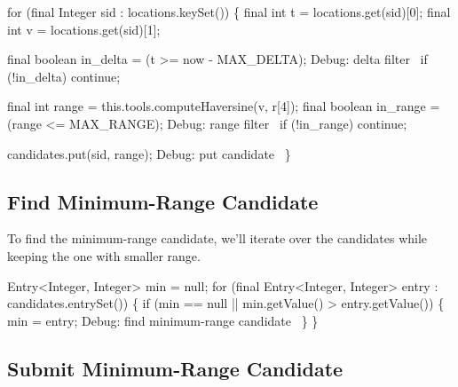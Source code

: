 \nwenddocs{}\endmoddef\nwstartdeflinemarkup{}\nwenddeflinemarkup
for (final Integer sid : locations.keySet()) \{
  final int t = locations.get(sid)[0];
  final int v = locations.get(sid)[1];

  final boolean in_delta = (t >= now - MAX_DELTA);
  \LA{}Debug: delta filter~{\nwtagstyle{}}\RA{}
  if (!in_delta)
    continue;

  final int range = this.tools.computeHaversine(v, r[4]);
  final boolean in_range = (range <= MAX_RANGE);
  \LA{}Debug: range filter~{\nwtagstyle{}}\RA{}
  if (!in_range)
    continue;

  candidates.put(sid, range);
  \LA{}Debug: put candidate~{\nwtagstyle{}}\RA{}
\}
\nwendcode{}\nwdocspar

\subsection{Find Minimum-Range Candidate}

To find the minimum-range candidate, we'll iterate over the candidates while
keeping the one with smaller range.

\nwenddocs{}\endmoddef\nwstartdeflinemarkup{}\nwenddeflinemarkup
Entry<Integer, Integer> min = null;
for (final Entry<Integer, Integer> entry : candidates.entrySet()) \{
  if (min == null || min.getValue() > entry.getValue()) \{
    min = entry;
    \LA{}Debug: find minimum-range candidate~{\nwtagstyle{}}\RA{}
  \}
\}
\nwendcode{}\nwdocspar

\subsection{Submit Minimum-Range Candidate}

